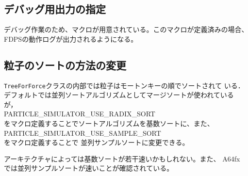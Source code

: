 \subsection{デバッグ用出力の指定}
\label{subsec:macro_debug}
デバッグ作業のため、マクロが用意されている。このマクロが定義済みの場合、FDPSの動作ログが出力されるようになる。

\subsection{粒子のソートの方法の変更}
\label{sec:compile_sort_method}

{\tt TreeForForce}クラスの内部では粒子はモートンキーの順でソートされて
いる．デフォルトでは並列ソートアルゴリズムとしてマージソートが使われている
が，\\
PARTICLE\_SIMULATOR\_USE\_RADIX\_SORT\\
をマクロ定義することでソートアルゴリズムを基数ソートに、また、\\
PARTICLE\_SIMULATOR\_USE\_SAMPLE\_SORT\\
をマクロ定義することで
並列サンプルソートに変更できる。

アーキテクチャによっては基数ソートが若干速いかもしれない。また、 A64fx
では並列サンプルソートが速いことが確認されている。
